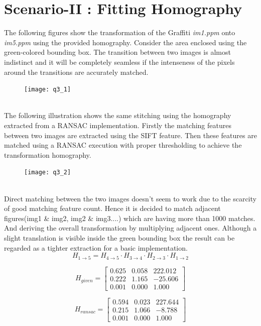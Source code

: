 \section*{Scenario-II : Fitting Homography}
The following figures show the transformation of the Graffiti \textit{im1.ppm} onto \textit{im5.ppm} using the provided homography. Consider the area enclosed using the green-colored bounding box. The transition between two images is almost indistinct and it will be completely seamless if the intenseness of the pixels around the transitions are accurately matched.
\begin{figure}[h]
    \begin{center}
        \texttt{[image: q3\_1]}
    \end{center}
\end{figure}
\\
The following illustration shows the same stitching using the homography extracted from a RANSAC implementation. Firstly the matching features between two images are extracted using the SIFT feature. Then these features are matched using a RANSAC execution with proper thresholding to achieve the transformation homography.
\begin{figure}[h]
    \begin{center}
        \texttt{[image: q3\_2]}
    \end{center}
\end{figure}
\\
Direct matching between the two images doesn't seem to work due to the scarcity of good matching feature count. Hence it is decided to match adjacent figures(img1 \& img2, img2 \& img3....) which are having more than 1000 matches. And deriving the overall transformation by multiplying adjacent ones. Although a slight translation is visible inside the green bounding box the result can be regarded as a tighter extraction for a basic implementation.
$$H_{1\to5}=H_{4\to5}\cdot H_{3\to4}\cdot H_{2\to3}\cdot H_{1\to2}$$
\vspace*{.2cm}
\begin{minipage}{.48\textwidth}
    \begin{equation*}
        H_{given}=\begin{bmatrix}
            0.625 & 0.058 & 222.012 \\
            0.222 & 1.165 & -25.606 \\
            0.001 & 0.000 & 1.000
        \end{bmatrix}
    \end{equation*}

\end{minipage}
\begin{minipage}{.48\textwidth}
    \begin{equation*}
        H_{ransac}=\begin{bmatrix}
            0.594 & 0.023 & 227.644 \\
            0.215 & 1.066 & -8.788  \\
            0.001 & 0.000 & 1.000
        \end{bmatrix}
    \end{equation*}
\end{minipage}

